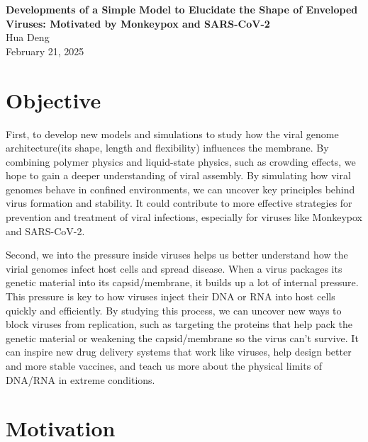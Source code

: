 \documentclass[12pt]{article}
\begin{document}
\doublespacing


\begin{center}
{\Large \textbf{Developments of a Simple Model to Elucidate the Shape of Enveloped Viruses: Motivated by Monkeypox and SARS-CoV-2}}\\[1.5ex]
{\normalsize  Hua Deng}\\

{\normalsize February 21, 2025}
\end{center}





\begin{flushleft}
\setlength{\parindent}{30pt}
\section*{Objective}
First, to develop new models and simulations to study how the viral genome architecture(its shape, length and flexibility) influences the membrane. By combining polymer physics and liquid-state physics, such as crowding effects, we hope to gain a deeper understanding of viral assembly. By simulating how viral genomes behave in confined environments, we can uncover key principles behind virus formation and stability. It could contribute to more effective strategies for prevention and treatment of viral infections, especially for viruses like Monkeypox and SARS-CoV-2.


Second, we into the pressure inside viruses helps us better understand how the virial genomes infect host cells and spread disease. When a virus packages its genetic material into its capsid/membrane, it builds up a lot of internal pressure. This pressure is key to how viruses inject their DNA or RNA into host cells quickly and efficiently. By studying this process, we can uncover new ways to block viruses from replication, such as targeting the proteins that help pack the genetic material or weakening the capsid/membrane so the virus can’t survive. It can inspire new drug delivery systems that work like viruses, help design better and more stable vaccines, and teach us more about the physical limits of DNA/RNA in extreme conditions.

\vspace{-1em} 
\section*{Motivation}


\end{flushleft}
\end{document}
